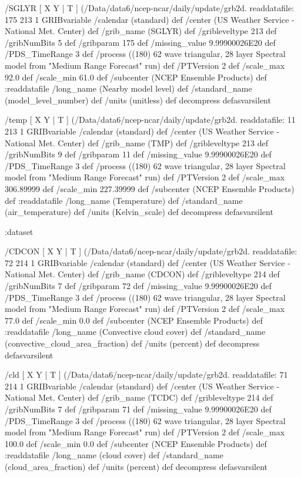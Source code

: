 \begin{ingrid}
   /SGLYR { [ X Y | T ] (/Data/data6/ncep-ncar/daily/update/grb2d.%
   readdatafile:
   175 213 1 GRIBvariable
   /calendar (standard) def
   /center (US Weather Service - National Met. Center) def
   /grib_name (SGLYR) def
   /gribleveltype 213 def
   /gribNumBits 5 def
   /gribparam 175 def
   /missing_value 9.99900026E20 def
   /PDS_TimeRange 3 def
   /process ((180) 62 wave triangular, 28 layer Spectral model from "Medium Range Forecast" run) def
   /PTVersion 2 def
   /scale_max 92.0 def
   /scale_min 61.0 def
   /subcenter (NCEP Ensemble Products) def
   :readdatafile
   /long_name (Nearby model level) def
   /standard_name (model_level_number) def
   /units (unitless) def
   decompress
   } defasvarsilent

   /temp { [ X Y | T ] (/Data/data6/ncep-ncar/daily/update/grb2d.%
   readdatafile:
   11 213 1 GRIBvariable
   /calendar (standard) def
   /center (US Weather Service - National Met. Center) def
   /grib_name (TMP) def
   /gribleveltype 213 def
   /gribNumBits 9 def
   /gribparam 11 def
   /missing_value 9.99900026E20 def
   /PDS_TimeRange 3 def
   /process ((180) 62 wave triangular, 28 layer Spectral model from "Medium Range Forecast" run) def
   /PTVersion 2 def
   /scale_max 306.89999 def
   /scale_min 227.39999 def
   /subcenter (NCEP Ensemble Products) def
   :readdatafile
   /long_name (Temperature) def
   /standard_name (air_temperature) def
   /units (Kelvin_scale) def
   decompress
   } defasvarsilent

  :dataset

  /CDCON { [ X Y | T ] (/Data/data6/ncep-ncar/daily/update/grb2d.%
  readdatafile:
  72 214 1 GRIBvariable
  /calendar (standard) def
  /center (US Weather Service - National Met. Center) def
  /grib_name (CDCON) def
  /gribleveltype 214 def
  /gribNumBits 7 def
  /gribparam 72 def
  /missing_value 9.99900026E20 def
  /PDS_TimeRange 3 def
  /process ((180) 62 wave triangular, 28 layer Spectral model from "Medium Range Forecast" run) def
  /PTVersion 2 def
  /scale_max 77.0 def
  /scale_min 0.0 def
  /subcenter (NCEP Ensemble Products) def
  :readdatafile
  /long_name (Convective cloud cover) def
  /standard_name (convective_cloud_area_fraction) def
  /units (percent) def
  decompress
  } defasvarsilent

  /cld { [ X Y | T ] (/Data/data6/ncep-ncar/daily/update/grb2d.%
  readdatafile:
  71 214 1 GRIBvariable
  /calendar (standard) def
  /center (US Weather Service - National Met. Center) def
  /grib_name (TCDC) def
  /gribleveltype 214 def
  /gribNumBits 7 def
  /gribparam 71 def
  /missing_value 9.99900026E20 def
  /PDS_TimeRange 3 def
  /process ((180) 62 wave triangular, 28 layer Spectral model from "Medium Range Forecast" run) def
  /PTVersion 2 def
  /scale_max 100.0 def
  /scale_min 0.0 def
  /subcenter (NCEP Ensemble Products) def
  :readdatafile
  /long_name (cloud cover) def
  /standard_name (cloud_area_fraction) def
  /units (percent) def
  decompress
  } defasvarsilent


\end{ingrid}
